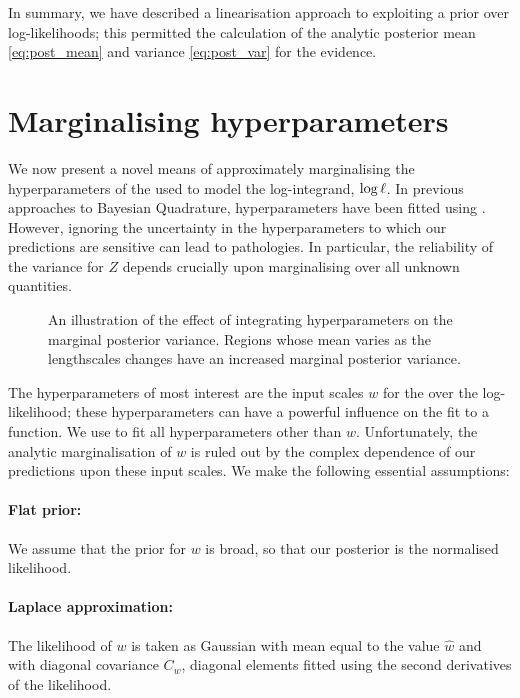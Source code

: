 \documentclass{article}
\begin{document}
In summary, we have described a linearisation approach to exploiting a  prior over log-likelihoods; this permitted the calculation of the analytic posterior mean \eqref{eq:post_mean} and variance \eqref{eq:post_var} for the evidence. 

\section{Marginalising hyperparameters}
\label{sec:marginalizing}

We now present a novel means of approximately marginalising the hyperparameters of the \gpb used to model the log-integrand, $\tr$. In previous approaches to Bayesian Quadrature, hyperparameters have been fitted using 
 . However, ignoring the uncertainty in the hyperparameters to which our predictions are sensitive can lead to pathologies. In particular, the reliability of the variance for $Z$ depends crucially upon marginalising over all unknown quantities. 

\begin{figure}
\centering
{}
\caption{An illustration of the effect of integrating hyperparameters on the marginal posterior variance.  Regions whose mean varies as the lengthscales changes have an increased marginal posterior variance.}
\label{fig:integrate_hypers}
\end{figure}

The hyperparameters of most interest are the input scales $w$ for the \gpb over the log-likelihood; these hyperparameters can have a powerful influence on the fit to a function. We use  to fit all hyperparameters other than $w$. Unfortunately, the analytic marginalisation of $w$ is ruled out by the complex dependence of our predictions upon these input scales. 
We make the following essential assumptions:

 \paragraph*{Flat prior:} We assume that the prior for $w$ is broad, so that our posterior is the normalised likelihood. 
\paragraph*{Laplace approximation:} The likelihood of $w$ is taken as Gaussian with mean equal to the  value $\hat{w}$ and with diagonal covariance $C_w$, diagonal elements fitted using the second derivatives of the likelihood.
\end{document}
